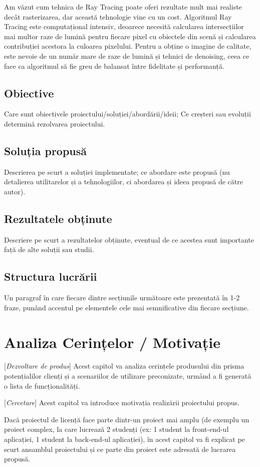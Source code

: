 \documentclass[12pt,a4paper]{report}
\newcommand{\worktype}[1]{[\textit{#1}] }
\newcommand{\dezvoltare}{\worktype{Dezvoltare de produs}}
\newcommand{\cercetare}{\worktype{Cercetare}}
\begin{document}
Am văzut cum tehnica de Ray Tracing poate oferi rezultate mult mai realiste
decât rasterizarea, dar această tehnologie vine cu un cost.
Algoritmul Ray Tracing este computațional intensiv, deoarece necesită
calcularea intersecțiilor mai multor raze de lumină pentru fiecare pixel cu obiectele din scenă
și calcularea contribuției acestora la culoarea pixelului. Pentru a obține o imagine
de calitate, este nevoie de un număr mare de raze de lumină și tehnici de denoising,
ceea ce face ca algoritmul să fie greu de balansat între fidelitate și performanță.

\section{Obiective}
Care sunt obiectivele proiectului/soluției/abordării/ideii; Ce creșteri sau evoluții determină rezolvarea proiectului.
\section{Soluția propusă}
Descrierea pe scurt a soluției implementate; ce abordare este propusă (nu detalierea utilitarelor și a tehnologiilor, ci abordarea și ideea propusă de către autor).
\section{Rezultatele obținute}
Descriere pe scurt a rezultatelor obținute, eventual de ce acestea sunt importante față de alte soluții sau studii.
\section{Structura lucrării}
Un paragraf în care fiecare dintre secțiunile următoare este prezentată în 1-2 fraze, punând accentul pe elementele cele mai semnificative din fiecare secțiune.



\chapter{Analiza Cerințelor / Motivație}
\dezvoltare Acest capitol va analiza cerințele produsului din prisma potențialilor clienți și a scenariilor de utilizare preconizate, urmând a fi generată o lista de funcționalități.

\cercetare Acest capitol va introduce motivația realizării proiectului propus.

Dacă proiectul de licență face parte dintr-un proiect mai amplu (de exemplu un proiect complex, la care lucrează 2 studenți (ex: 1 student la front-end-ul aplicației, 1 student la back-end-ul aplicației), în acest capitol va fi explicat pe scurt ansamblul proiectului și ce parte din proiect este adresată de lucrarea propusă.
\end{document}
